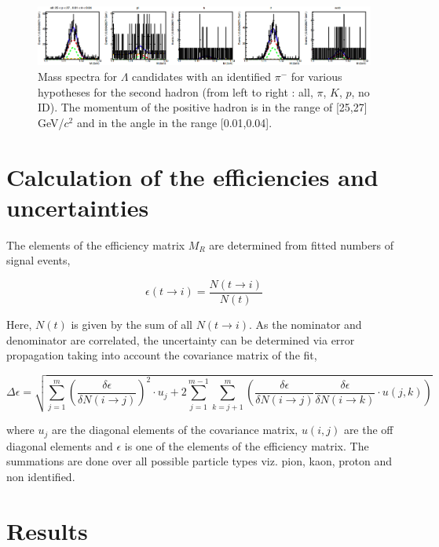 \begin{figure}[!h]
  \centering
	\includegraphics[scale=0.3]{./gfx/LambdaMassSpectra.png}
	\caption{Mass spectra for $\Lambda$ candidates with an identified $\pi^-$ for various hypotheses for the second hadron (from left to right : all, $\pi$, $K$, $p$, no ID). The momentum of the positive hadron is in the range of [25,27] GeV/$c^2$ and in the angle in the range [0.01,0.04].}
	\label{pic:LambdaMassSpectra}
\end{figure}

\section{Calculation of the efficiencies and uncertainties}

The elements of the efficiency matrix $M_R$ are determined from fitted numbers of signal events,

\begin{equation}
  \epsilon(t\rightarrow i) = \frac{N(t\rightarrow i)}{N(t)}
\end{equation}

Here, $N(t)$ is given by the sum of all $N(t \rightarrow i)$. As the nominator and denominator are correlated, the uncertainty can be determined via error propagation taking into account the covariance matrix of the fit,

\begin{equation}
  \Delta \epsilon = \sqrt{\sum_{j=1}^m \left( \frac{\delta \epsilon}{\delta N(i\rightarrow j)} \right)^2 \cdot u_j + 2 \sum_{j=1}^{m-1} \sum_{k=j+1}^{m} \left( \frac{\delta \epsilon}{\delta N(i\rightarrow j)} \frac{\delta \epsilon}{\delta N(i\rightarrow k)} \cdot u(j,k) \right)}
\end{equation}

where $u_j$ are the diagonal elements of the covariance matrix, $u(i,j)$ are the off diagonal elements and $\epsilon$ is one of the elements of the efficiency matrix. The summations are done over all possible particle types viz. pion, kaon, proton and non identified.

\section{Results}

